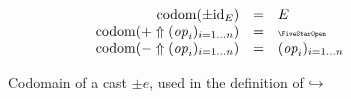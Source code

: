 \begin{figure}
\[
\begin{array}{rcl}
  \codom{\pm \effid_E} & = & E \\
  \codom{+ \Uparrow \fori{i}{n}{\effop_i}} & = & \effany \\
  \codom{- \Uparrow \fori{i}{n}{\effop_i}} & = & \fori{i}{n}{\effop_i}
\end{array}
\]
\caption{Codomain of a cast $\pm e$, used in the definition of $\hookrightarrow$}
\end{figure}
